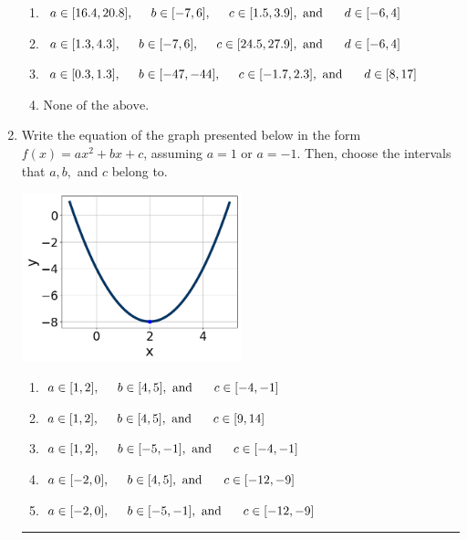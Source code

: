 \documentclass[14pt]{extbook}
\newcommand{\litem}[1]{\item#1\hspace*{-1cm}\rule{\textwidth}{0.4pt}}
\begin{document}
\begin{enumerate}
{\begin{enumerate}[label=\Alph*.]
\item \( a \in [16.4, 20.8], \hspace*{5mm} b \in [-7, 6], \hspace*{5mm} c \in [1.5, 3.9], \text{ and } \hspace*{5mm} d \in [-6, 4] \)
\item \( a \in [1.3, 4.3], \hspace*{5mm} b \in [-7, 6], \hspace*{5mm} c \in [24.5, 27.9], \text{ and } \hspace*{5mm} d \in [-6, 4] \)
\item \( a \in [0.3, 1.3], \hspace*{5mm} b \in [-47, -44], \hspace*{5mm} c \in [-1.7, 2.3], \text{ and } \hspace*{5mm} d \in [8, 17] \)
\item \( \text{None of the above.} \)

\end{enumerate} }
\litem{
Write the equation of the graph presented below in the form $f(x)=ax^2+bx+c$, assuming  $a=1$ or $a=-1$. Then, choose the intervals that $a, b,$ and $c$ belong to.
\begin{center}
    \includegraphics[width=0.5\textwidth]{../Figures/quadraticGraphToEquationCopyC.png}
\end{center}
\begin{enumerate}[label=\Alph*.]
\item \( a \in [1, 2], \hspace*{5mm} b \in [4, 5], \text{ and } \hspace*{5mm} c \in [-4, -1] \)
\item \( a \in [1, 2], \hspace*{5mm} b \in [4, 5], \text{ and } \hspace*{5mm} c \in [9, 14] \)
\item \( a \in [1, 2], \hspace*{5mm} b \in [-5, -1], \text{ and } \hspace*{5mm} c \in [-4, -1] \)
\item \( a \in [-2, 0], \hspace*{5mm} b \in [4, 5], \text{ and } \hspace*{5mm} c \in [-12, -9] \)
\item \( a \in [-2, 0], \hspace*{5mm} b \in [-5, -1], \text{ and } \hspace*{5mm} c \in [-12, -9] \)


\end{enumerate}}
\end{enumerate}
\end{document}
